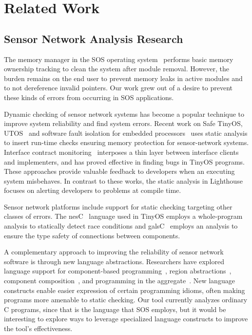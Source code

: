 \section{Related Work}
\label{sec:related}

\subsection{Sensor Network Analysis Research}

The memory manager in the SOS operating
system~\cite{sos} performs basic memory ownership tracking to clean
the system after module removal.
%
However, the burden remains on the end user to prevent memory leaks in
active modules and to not dereference invalid pointers.
%
Our work grew out of a desire to prevent these kinds of errors from
occurring in SOS applications.



Dynamic checking of sensor network systems has become a popular technique to
improve system reliability and find system errors.
%
Recent work on Safe TinyOS, UTOS~\cite{regehr06memory} and software fault
isolation for embedded processors~\cite{kumar07system} uses static analysis
to insert run-time checks ensuring memory protection for sensor-network
systems.
%
Interface contract monitoring~\cite{archer07interface} interposes a thin
layer between interface clients and implementers, and has proved effective
in finding bugs in TinyOS programs.
%
These approaches provide valuable feedback to developers when an executing
system misbehaves.
%
In contrast to these works, the static analysis in Lighthouse focuses on
alerting developers to problems at compile time.



Sensor network platforms include support for static checking targeting
other classes of errors.  
%
The nesC~\cite{nesC} language used in TinyOS employs a whole-program
analysis to statically detect race conditions and
galsC~\cite{TinyGALS,galsC} employs an analysis to ensure the type safety of
connections between components.  



A complementary approach to improving the reliability of sensor network
software is through new language abstractions.  
%
Researchers have explored language support for component-based
programming~\cite{TinyOS,nesC,galsC}, region
abstractions~\cite{conf/mobisys/WhitehouseSCB04,conf/nsdi/WelshM04},
component composition~\cite{conf/sensys/GreensteinKE04}, and programming in
the aggregate~\cite{1052213,conf/dcoss/GummadiGG05}.
%
New language constructs enable easier expression of certain programming
idioms, often making programs more amenable to static checking.  
%
Our tool currently analyzes ordinary C programs, since that is the language
that SOS employs, but it would be interesting to explore ways to leverage
specialized language constructs to improve the tool's effectiveness.



